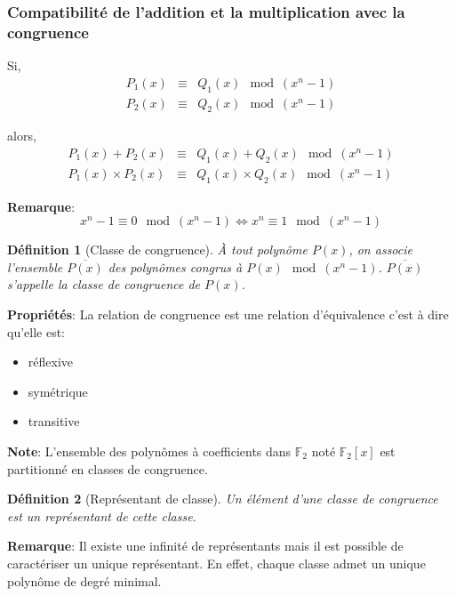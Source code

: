\documentclass[a4paper,10pt,twocolumn]{article}
\theoremstyle{break}
\newcommand{\F}{\mathbb{F}}
\newcommand{\FF}{\F_2}
\newtheorem{mydef}{Définition}
\newenvironment{note}[1]
{\textbf{#1}:}
{}
\newenvironment{remarque}
{\begin{note}{Remarque}}
{\end{note}}
\newenvironment{proprietes}
{\begin{note}{Propriétés}}
{\end{note}}
\begin{document}
\subsubsection{Compatibilité de l'addition et la multiplication avec la congruence}

Si, 
\begin{eqnarray*}
 P_1(x) & \equiv & Q_1(x) \mod (x^n - 1) \\
 P_2(x) & \equiv & Q_2(x) \mod (x^n - 1)
\end{eqnarray*}

alors, 
\begin{eqnarray*}
P_1(x) + P_2(x) & \equiv & Q_1(x) + Q_2(x) \mod (x^n-1) \\
P_1(x) \times P_2(x) & \equiv & Q_1(x) \times Q_2(x) \mod (x^n-1)
\end{eqnarray*}

\begin{remarque}
 $$ x^n-1 \equiv 0 \mod (x^n-1) \Leftrightarrow x^n \equiv 1 \mod (x^n-1) $$
\end{remarque}

\begin{mydef}[Classe de congruence]
 À tout polynôme $P(x)$, on associe l'ensemble $\overline{P(x)}$ des polynômes congrus à $P(x) \mod (x^n - 1)$.
 $\overline{P(x)}$ s'appelle la classe de congruence de $P(x)$.
\end{mydef}

\begin{proprietes}
 La relation de congruence est une relation d'équivalence c'est à dire qu'elle est:

 \begin{itemize}
  \item réflexive
  \item symétrique
  \item transitive
 \end{itemize}

\end{proprietes}

\begin{note}{Note}
 L'ensemble des polynômes à coefficients dans $\FF$ noté $\FF[x]$ est partitionné en classes de congruence.
\end{note}

\begin{mydef}[Représentant de classe]
 Un élément d'une classe de congruence est un représentant de cette classe.
\end{mydef}

\begin{remarque}
 Il existe une infinité de représentants mais il est possible de caractériser un unique représentant. 
 En effet, chaque classe admet un unique polynôme de degré minimal.
\end{remarque}
\end{document}

